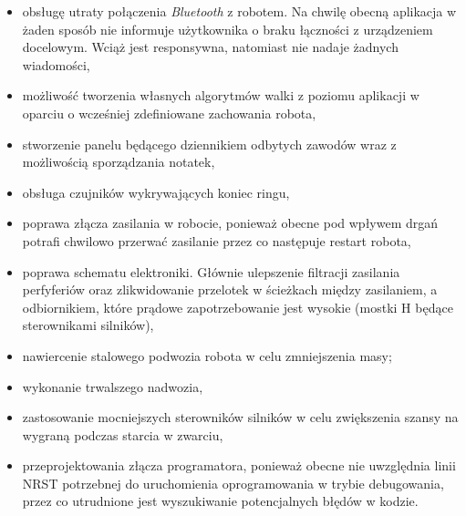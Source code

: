 \begin{itemize}
\item obsługę utraty połączenia \textit{Bluetooth} z robotem. Na chwilę obecną aplikacja w żaden sposób nie informuje użytkownika o braku łączności z urządzeniem docelowym. Wciąż jest responsywna, natomiast nie nadaje żadnych wiadomości,
\item możliwość tworzenia własnych algorytmów walki z poziomu aplikacji w oparciu o wcześniej zdefiniowane zachowania robota,
\item stworzenie panelu będącego dziennikiem odbytych zawodów wraz z możliwością sporządzania notatek,
\item obsługa czujników wykrywających koniec ringu,
\item poprawa złącza zasilania w robocie, ponieważ obecne pod wpływem drgań potrafi chwilowo przerwać zasilanie przez co następuje restart robota,
\item poprawa schematu elektroniki. Głównie ulepszenie filtracji zasilania perfyferiów oraz zlikwidowanie przelotek w ścieżkach między zasilaniem, a odbiornikiem, które prądowe zapotrzebowanie jest wysokie (mostki H będące sterownikami silników),
\item nawiercenie stalowego podwozia robota w celu zmniejszenia masy;
\item wykonanie trwalszego nadwozia,
\item zastosowanie mocniejszych sterowników silników w celu zwiększenia szansy na wygraną podczas starcia w zwarciu,
\item przeprojektowania złącza programatora, ponieważ obecne nie uwzględnia linii NRST potrzebnej do uruchomienia oprogramowania w trybie debugowania, przez co utrudnione jest wyszukiwanie potencjalnych błędów w kodzie. 
\end{itemize}

